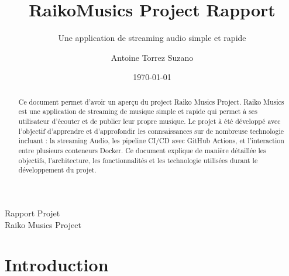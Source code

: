 \documentclass[12pt,a4paper]{article} %
\title{RaikoMusics Project Rapport}      %
\subtitle{Une application de streaming audio simple et rapide}  %
\author{Antoine Torrez Suzano} %
\date{\today}                       %
\begin{document}
\maketitle
\begin{abstract}
Ce document permet d'avoir un aperçu du project Raiko Musics Project. Raiko Musics est une application de streaming de musique simple et rapide qui permet à ses utilisateur d'écouter et de publier leur propre musique. Le projet à été développé avec l'objectif d'apprendre et d'approfondir les connsaissances sur de nombreuse technologie incluant : la streaming Audio, les pipeline CI/CD avec GitHub Actions, et l'interaction entre plusieurs conteneurs Docker. Ce document explique de manière détaillée les objectifs, l'architecture, les fonctionnalités et les technologie utilisées durant le développement du projet.
\end{abstract}
\begin{center}
    \vfill
    \begin{figure}[h!]
        \centering
        \end{figure}
        \setcounter{figure}{0}
        
    Rapport Projet\\
    Raiko Musics Project
\end{center}
\newpage
\renewcommand*\contentsname{Table des matières} %
{
\hypersetup{linkcolor=}
\setcounter{tocdepth}{5} %
\tableofcontents
}
\newpage
{} %


\section{Introduction}
\end{document}
